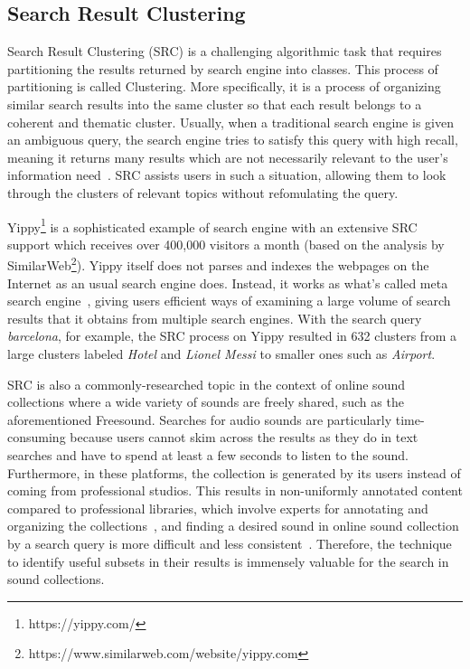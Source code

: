 \subsection{Search Result Clustering}
Search Result Clustering (SRC) is a challenging algorithmic task that requires partitioning the results returned by search engine into classes. This process of partitioning is called Clustering. More specifically, it is a process of organizing similar search results into the same cluster so that each result belongs to a coherent and thematic cluster. Usually, when a traditional search engine is given an ambiguous query, the search engine tries to satisfy this query with high recall, meaning it returns many results which are not necessarily relevant to the user's information need~\cite{ugo2012}. SRC assists users in such a situation, allowing them to look through the clusters of relevant topics without refomulating the query.

Yippy\footnote{https://yippy.com/} is a sophisticated example of search engine with an extensive SRC support which receives over 400,000 visitors a month (based on the analysis by SimilarWeb\footnote{https://www.similarweb.com/website/yippy.com}). Yippy itself does not parses and indexes the webpages on the Internet as an usual search engine does. Instead, it works as what's called meta search engine~\cite{glover2000}, giving users efficient ways of examining a large volume of search results that it obtains from multiple search engines. With the search query \textit{barcelona}, for example, the SRC process on Yippy resulted in 632 clusters from a large clusters labeled \textit{Hotel} and \textit{Lionel Messi} to smaller ones such as \textit{Airport}.

SRC is also a commonly-researched topic in the context of online sound collections where a wide variety of sounds are freely shared, such as the aforementioned Freesound. Searches for audio sounds are particularly time-consuming because users cannot skim across the results as they do in text searches and have to spend at least a few seconds to listen to the sound. Furthermore, in these platforms, the collection is generated by its users instead of coming from professional studios. This results in non-uniformly annotated content compared to professional libraries, which involve experts for annotating and organizing the collections~\cite{frederic2013}, and finding a desired sound in online sound collection by a search query is more difficult and less consistent~\cite{xavier2020}.
Therefore, the technique to identify useful subsets in their results is immensely valuable for the search in sound collections. 

